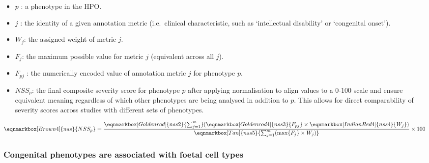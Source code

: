 \documentclass[
]{article}
\begin{document}
\begin{itemize}
\item
  \(p\) : a phenotype in the HPO.
\item
  \(j\) : the identity of a given annotation metric (i.e.~clinical
  characteristic, such as `intellectual disability' or `congenital
  onset').
\item
  \(W_j\): the assigned weight of metric \(j\).
\item
  \(F_j\): the maximum possible value for metric \(j\) (equivalent
  across all \(j\)).
\item
  \(F_{pj}\) : the numerically encoded value of annotation metric \(j\)
  for phenotype \(p\).
\item
  \(NSS_p\): the final composite severity score for phenotype \(p\)
  after applying normalisation to align values to a 0-100 scale and
  ensure equivalent meaning regardless of which other phenotypes are
  being analysed in addition to \(p\). This allows for direct
  comparability of severity scores across studies with different sets of
  phenotypes.
\end{itemize}

\hfill\break
\hfill\break

\begin{equation*}
  \eqnmarkbox[Brown4]{nss}{NSS_p}
  =
  \frac{ 
    \eqnmarkbox[Goldenrod]{nss2}{\sum_{j=1}^{m}} 
    (
      \eqnmarkbox[Goldenrod4]{nss3}{F_{pj}}
      \times 
      \eqnmarkbox[IndianRed4]{nss4}{W_j}
    )
    }{
    \eqnmarkbox[Tan]{nss5}{\sum_{j=1}^{m}(\max\{F_j\} \times W_j)} 
  } \times 100
\end{equation*}

\hfill\break

\subsubsection{Congenital phenotypes are associated with foetal cell
types}\label{congenital-phenotypes-are-associated-with-foetal-cell-types-1}
\end{document}
